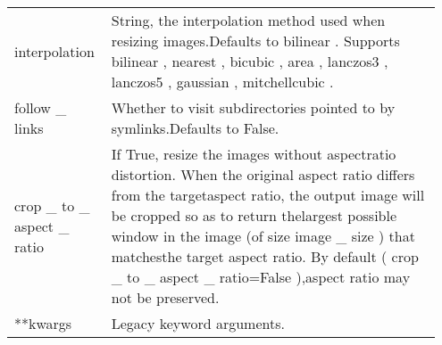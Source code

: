 \documentclass[
	letterpaper, %
	10pt, %
	unnumberedsections, %
	twoside, %
]{LTJournalArticle}
\begin{document}
\begin{table*}[ht!]
\begin{tabular}{L{0.2\linewidth} L{0.75\linewidth}}
        interpolation                 & String, the interpolation method used when resizing images.Defaults to bilinear . Supports bilinear , nearest , bicubic , area , lanczos3 , lanczos5 , gaussian , mitchellcubic .                                                                                                                                                                                                                                                        \\
        follow \_ links               & Whether to visit subdirectories pointed to by symlinks.Defaults to False.                                                                                                                                                                                                                                                                                                                                                                \\
        crop \_ to \_ aspect \_ ratio & If True, resize the images without aspectratio distortion. When the original aspect ratio differs from the targetaspect ratio, the output image will be cropped so as to return thelargest possible window in the image (of size image \_ size ) that matchesthe target aspect ratio. By default ( crop \_ to \_ aspect \_ ratio=False ),aspect ratio may not be preserved.                                                              \\
        **kwargs                      & Legacy keyword arguments.                                                                                                                                                                                                                                                                                                                                                                                                                \\
		\bottomrule
	\end{tabular}
    \label{tab:tensorflow_image_dataset_from_directory}
\end{table*}
\end{document}
